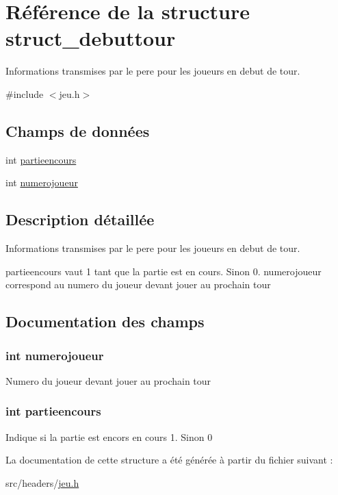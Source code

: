 \hypertarget{structstruct__debuttour}{\section{Référence de la structure struct\-\_\-debuttour}
\label{structstruct__debuttour}
}


Informations transmises par le pere pour les joueurs en debut de tour.  




{\ttfamily \#include $<$jeu.\-h$>$}

\subsection*{Champs de données}
\begin{DoxyCompactItemize}
\item 
int \hyperlink{structstruct__debuttour_ae1ce459099bf548d3ae61f39c892ebbe}{partieencours}
\item 
int \hyperlink{structstruct__debuttour_a3e4028dc4a9077afc6e53e423343bd70}{numerojoueur}
\end{DoxyCompactItemize}


\subsection{Description détaillée}
Informations transmises par le pere pour les joueurs en debut de tour. 

partieencours vaut 1 tant que la partie est en cours. Sinon 0. numerojoueur correspond au numero du joueur devant jouer au prochain tour 

\subsection{Documentation des champs}
\hypertarget{structstruct__debuttour_a3e4028dc4a9077afc6e53e423343bd70}{
\subsubsection[{numerojoueur}]{\setlength{\rightskip}{0pt plus 5cm}int numerojoueur}}\label{structstruct__debuttour_a3e4028dc4a9077afc6e53e423343bd70}
Numero du joueur devant jouer au prochain tour \hypertarget{structstruct__debuttour_ae1ce459099bf548d3ae61f39c892ebbe}{
\subsubsection[{partieencours}]{\setlength{\rightskip}{0pt plus 5cm}int partieencours}}\label{structstruct__debuttour_ae1ce459099bf548d3ae61f39c892ebbe}
Indique si la partie est encors en cours 1. Sinon 0 

La documentation de cette structure a été générée à partir du fichier suivant \-:\begin{DoxyCompactItemize}
\item 
src/headers/\hyperlink{jeu_8h}{jeu.\-h}\end{DoxyCompactItemize}

